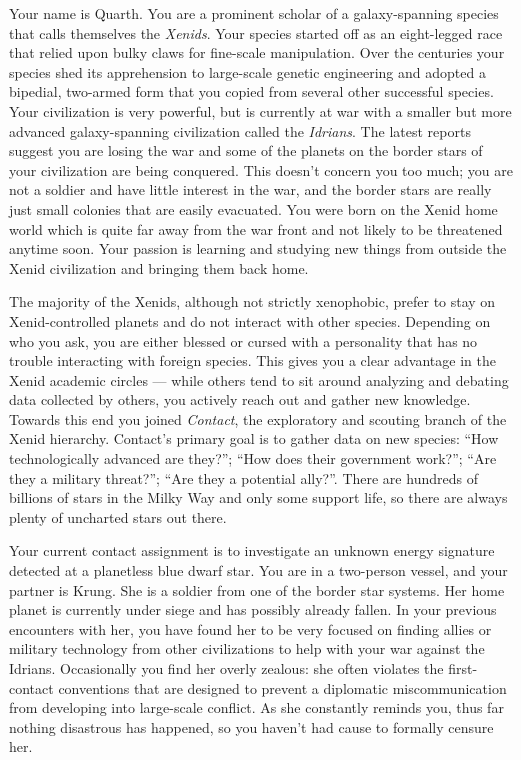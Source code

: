\documentclass[char]{guildcamp1}
\begin{document}
\name{\cPassive{}}


Your name is Quarth. You are a prominent scholar of a galaxy-spanning species that calls themselves the \emph{Xenids}. Your species started off as an eight-legged race that relied upon bulky claws for fine-scale manipulation. Over the centuries your species shed its apprehension to large-scale genetic engineering and adopted a bipedial, two-armed form that you copied from several other successful species. Your civilization is very powerful, but is currently at war with a smaller but more advanced galaxy-spanning civilization called the \emph{Idrians}. The latest reports suggest you are losing the war and some of the planets on the border stars of your civilization are being conquered. This doesn't concern you too much; you are not a soldier and have little interest in the war, and the border stars are really just small colonies that are easily evacuated. You were born on the Xenid home world which is quite far away from the war front and not likely to be threatened anytime soon. Your passion is learning and studying new things from outside the Xenid civilization and bringing them back home.

The majority of the Xenids, although not strictly xenophobic, prefer to stay on Xenid-controlled planets and do not interact with other species. Depending on who you ask, you are either blessed or cursed with a personality that has no trouble interacting with foreign species. This gives you a clear advantage in the Xenid academic circles --- while others tend to sit around analyzing and debating data collected by others, you actively reach out and gather new knowledge. Towards this end you joined \emph{Contact}, the exploratory and scouting branch of the Xenid hierarchy. Contact's primary goal is to gather data on new species: ``How technologically advanced are they?''; ``How does their government work?''; ``Are they a military threat?''; ``Are they a potential ally?''. There are hundreds of billions of stars in the Milky Way and only some support life, so there are always plenty of uncharted stars out there.

Your current contact assignment is to investigate an unknown energy signature detected at a planetless blue dwarf star. You are in a two-person vessel, and your partner is Krung. She is a soldier from one of the border star systems. Her home planet is currently under siege and has possibly already fallen. In your previous encounters with her, you have found her to be very focused on finding allies or military technology from other civilizations to help with your war against the Idrians. Occasionally you find her overly zealous: she often violates the first-contact conventions that are designed to prevent a diplomatic miscommunication from developing into large-scale conflict. As she constantly reminds you, thus far nothing disastrous has happened, so you haven't had cause to formally censure her.
\end{document}
